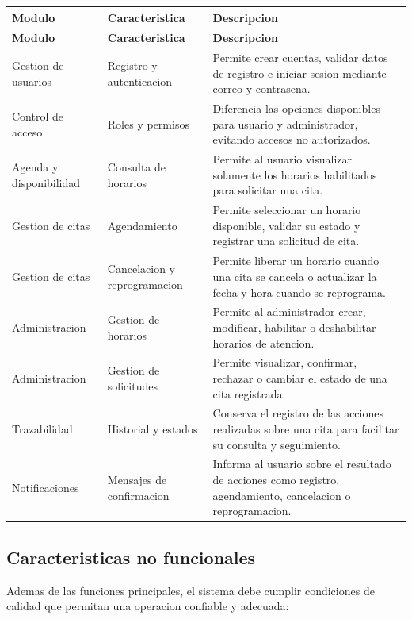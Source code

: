 \documentclass[12pt,letterpaper]{article}
\begin{document}
\begin{longtable}{|p{3.3cm}|p{5.2cm}|p{6.2cm}|}
\hline
\textbf{Modulo} & \textbf{Caracteristica} & \textbf{Descripcion} \\
\hline
\endfirsthead
\hline
\textbf{Modulo} & \textbf{Caracteristica} & \textbf{Descripcion} \\
\hline
\endhead
\hline
\endfoot
\hline
\endlastfoot

Gestion de usuarios & Registro y autenticacion & Permite crear cuentas, validar datos de registro e iniciar sesion mediante correo y contrasena. \\
\hline
Control de acceso & Roles y permisos & Diferencia las opciones disponibles para usuario y administrador, evitando accesos no autorizados. \\
\hline
Agenda y disponibilidad & Consulta de horarios & Permite al usuario visualizar solamente los horarios habilitados para solicitar una cita. \\
\hline
Gestion de citas & Agendamiento & Permite seleccionar un horario disponible, validar su estado y registrar una solicitud de cita. \\
\hline
Gestion de citas & Cancelacion y reprogramacion & Permite liberar un horario cuando una cita se cancela o actualizar la fecha y hora cuando se reprograma. \\
\hline
Administracion & Gestion de horarios & Permite al administrador crear, modificar, habilitar o deshabilitar horarios de atencion. \\
\hline
Administracion & Gestion de solicitudes & Permite visualizar, confirmar, rechazar o cambiar el estado de una cita registrada. \\
\hline
Trazabilidad & Historial y estados & Conserva el registro de las acciones realizadas sobre una cita para facilitar su consulta y seguimiento. \\
\hline
Notificaciones & Mensajes de confirmacion & Informa al usuario sobre el resultado de acciones como registro, agendamiento, cancelacion o reprogramacion. \\
\hline
\end{longtable}

\subsection{Caracteristicas no funcionales}

Ademas de las funciones principales, el sistema debe cumplir condiciones de calidad que permitan una operacion confiable y adecuada:
\end{document}
